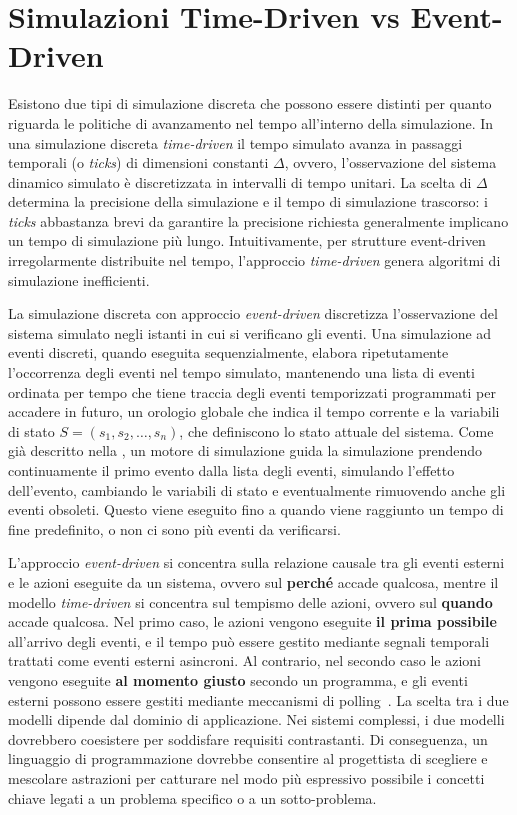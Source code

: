 \documentclass[12pt,a4paper,openright,twoside]{book}
\begin{document}
\section{Simulazioni Time-Driven vs Event-Driven}
Esistono due tipi di simulazione discreta che possono essere distinti per quanto riguarda le politiche di avanzamento nel tempo all'interno della simulazione. In una simulazione discreta \textit{time-driven} il tempo simulato avanza in passaggi temporali (o \textit{ticks}) di dimensioni constanti $\Delta$, ovvero, l'osservazione del sistema dinamico simulato è discretizzata in intervalli di tempo unitari. La scelta di $\Delta$ determina la precisione della simulazione e il tempo di simulazione trascorso: i \textit{ticks} abbastanza brevi da garantire la precisione richiesta generalmente implicano un tempo di simulazione più lungo. Intuitivamente, per strutture event-driven irregolarmente distribuite nel tempo, l'approccio \textit{time-driven} genera algoritmi di simulazione inefficienti. 

La simulazione discreta con approccio \textit{event-driven} discretizza l'osservazione del sistema simulato negli istanti in cui si verificano gli eventi. Una simulazione ad eventi discreti, quando eseguita sequenzialmente, elabora ripetutamente l'occorrenza degli eventi nel tempo simulato, mantenendo una lista di eventi ordinata per tempo che tiene traccia degli eventi temporizzati programmati per accadere in futuro, un orologio globale che indica il tempo corrente e la variabili di stato $S = (s_1, s_2, \dots, s_n)$, che definiscono lo stato attuale del sistema. Come già descritto nella , un motore di simulazione guida la simulazione prendendo continuamente il primo evento dalla lista degli eventi, simulando l'effetto dell'evento, cambiando le variabili di stato e eventualmente rimuovendo anche gli eventi obsoleti. Questo viene eseguito fino a quando viene raggiunto un tempo di fine predefinito, o non ci sono più eventi da verificarsi.

L'approccio \textit{event-driven} si concentra sulla relazione causale tra gli eventi esterni e le azioni eseguite da un sistema, ovvero sul \textbf{perché} accade qualcosa, mentre il modello \textit{time-driven} si concentra sul tempismo delle azioni, ovvero sul \textbf{quando} accade qualcosa. Nel primo caso, le azioni vengono eseguite \textbf{il prima possibile} all'arrivo degli eventi, e il tempo può essere gestito mediante segnali temporali trattati come eventi esterni asincroni. Al contrario, nel secondo caso le azioni vengono eseguite \textbf{al momento giusto} secondo un programma, e gli eventi esterni possono essere gestiti mediante meccanismi di polling~\cite{TISATO199531}.
La scelta tra i due modelli dipende dal dominio di applicazione. Nei sistemi complessi, i due modelli dovrebbero coesistere per soddisfare requisiti contrastanti. Di conseguenza, un linguaggio di programmazione dovrebbe consentire al progettista di scegliere e mescolare astrazioni per catturare nel modo più espressivo possibile i concetti chiave legati a un problema specifico o a un sotto-problema. 
\end{document}
